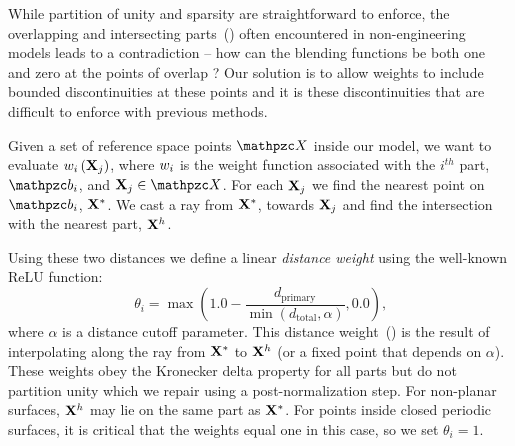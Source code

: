 While partition of unity and sparsity are straightforward to enforce, the overlapping and intersecting parts~() often encountered in non-engineering models leads
to a contradiction -- how can the blending functions be both one and zero at the points of overlap ? 
Our solution is to allow weights to include bounded discontinuities at these points and it is these discontinuities that are difficult to enforce 
with previous methods. 

Given a set of reference space points $\st{X}$ inside our model, we want to evaluate $w_i\left(\mathbf{X}_j\right)$, where $w_i$ is the weight function associated with 
the $i^{th}$ part, $\prt_i$, and $\refX_j\in\st{X}$. 
For each $\mathbf{X}_j$ we find the nearest point on $\prt_i$, $\mathbf{X}^*$.
We cast a ray from $\mathbf{X}^*$, towards $\mathbf{X}_j$ and find the intersection with the nearest part, $\mathbf{X}^h$.

Using these two distances we define a linear \emph{distance weight} using the well-known ReLU function:
\begin{equation}
\theta_i = \max (1.0 - \frac{d_{\text{primary}}}{\min (d_{\text{total}}, \alpha)}, 0.0)
\text{,}
\end{equation}
where $\alpha$ is a distance cutoff parameter. 
This distance weight~() is the result of interpolating along the ray from $\mathbf{X}^*$ to $\mathbf{X}^h$ (or a fixed point that depends on $\alpha$). 
These weights obey the Kronecker delta property for all parts but do not partition unity which we repair using a post-normalization step. For non-planar surfaces, $\mathbf{X}^h$ may lie on the same part as $\mathbf{X}^*$. For points inside closed periodic surfaces, it is critical that the weights equal one in this case, so we set $\theta_i = 1$.



